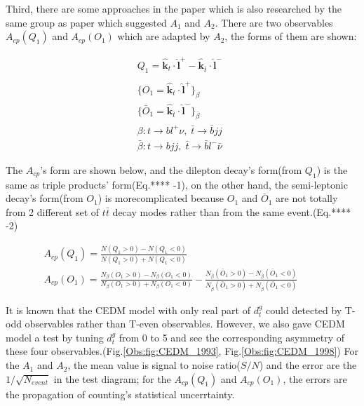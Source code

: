 
			Third, there are some approaches in the paper \cite{Bernreuther:1998qv} which is also researched by the same group as paper\cite{Bernreuther:1993hq} which suggested $A_1$ and $A_2$. There are two observables $A_{cp}(Q_1)$ and $A_{cp}(O_1)$ which are adapted by $A_2$, the forms of them are shown:

			\begin{equation}
			\begin{split} 
			Q_1 = \hat{\textbf{k}}_t \cdot \hat{\textbf{l}}^+ - \hat{\textbf{k}}_{\bar{t}} \cdot \hat{\textbf{l}}^- \;\\
			 \\
			\{ O_1 = \hat{\textbf{k}}_t \cdot \hat{\textbf{l}}^+ \}_{\beta} \;\;\;\;\;\;\;\;\;\;\\
			\{\bar{O}_1 = \hat{\textbf{k}}_{\bar{t}} \cdot \hat{\textbf{l}}^- \}_{\bar{\beta}} \;\;\;\;\;\;\;\;\;\;\\
			\beta : t\rightarrow bl^+\nu,\; \bar{t}\rightarrow \bar{b}jj \\
			\bar{\beta} : t\rightarrow bjj,\; \bar{t}\rightarrow \bar{b} l^- \bar{\nu} 
			\end{split}
			\label{eq:1998_001}
			\end{equation}

			The $A_{cp}$'s form are shown below, and the dilepton decay's form(from $Q_1$) is the same as triple products' form(Eq.**** -1), on the other hand, the semi-leptonic decay's form(from $O_1$) is morecomplicated because $O_1$ and $\bar{O}_1$ are not totally from 2 different set of $t\bar{t}$ decay modes rather than from the same event.(Eq.**** -2)

			\begin{equation}
			\begin{split} 
			A_{cp}(Q_1) = \frac{ N(Q_1 > 0) - N(Q_1 < 0) }{N(Q_1 > 0) + N(Q_1 < 0) } \;\;\;\;\;\;\;\;\;\;\;\;\;\;\;\;\;\;\;\;\;\;\;\;\;\;\;\;\;\;\;\;\;\;\;\;\;\;\;\;\;\;\;\;\;\;\;\;\;\\
			A_{cp}(O_1) = \frac{ N_{\beta}(O_1 > 0) - N_{\beta}(O_1 < 0) }{N_{\beta}(O_1 > 0) + N_{\beta}(O_1 < 0) } - \frac{ N_{\bar{\beta}}(\bar{O}_1 > 0) - N_{\bar{\beta}}(\bar{O}_1 < 0) }{N_{\bar{\beta}}(\bar{O}_1 > 0) + N_{\bar{\beta}}(\bar{O}_1 < 0) } 
			\end{split}
			\label{eq:1998_002}
			\end{equation}


			It is known that the CEDM model with only real part of $d_t^g$ could detected by T-odd observables rather than T-even observables. However, we also gave CEDM model a test by tuning $d_t^g$ from 0 to 5 and see the corresponding asymmetry of these four observables.(Fig.\ref{Obs:fig:CEDM_1993}, Fig.\ref{Obs:fig:CEDM_1998}) For the $A_1$ and $A_2$, the mean value is signal to noise ratio($S/N$) and the error are the $1/\sqrt{N_{event}}$ in the test diagram; for the $A_{cp}(Q_1)$ and $A_{cp}(O_1)$, the errors are the propagation of counting's statistical uncerrtainty.

